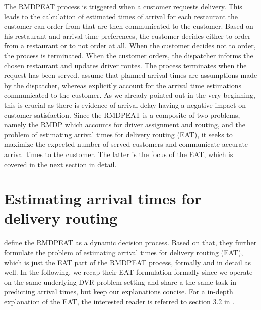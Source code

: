 The RMDPEAT process is triggered when a customer requests delivery. This leads to the calculation of estimated times of arrival for each restaurant the customer can order from that are then communicated to the customer. Based on his restaurant and arrival time preferences, the customer decides either to order from a restaurant or to not order at all. When the customer decides not to order, the process is terminated. When the customer orders, the dispatcher informs the chosen restaurant and updates driver routes. The process terminates when the request has been served. 
\cite{UlmerBarrett2017_TWAP} assume that planned arrival times are assumptions made by the dispatcher, whereas \cite{Hildebrandt2020_EAT} explicitly account for the arrival time estimations communicated to the customer. As we already pointed out in the very beginning, this is crucial as there is evidence of arrival delay having a negative impact on customer satisfaction.
Since the RMDPEAT is a composite of two problems, namely the RMDP which accounts for driver assignment and routing, and the problem of estimating arrival times for delivery routing (EAT), it seeks to maximize the expected number of served customers and communicate accurate arrival times to the customer. The latter is the focus of the EAT, which is covered in the next section in detail.

\section{Estimating arrival times for delivery routing}

\cite{Hildebrandt2020_EAT} define the RMDPEAT as a dynamic decision process. Based on that, they further formulate the problem of estimating arrival times for delivery routing (EAT), which is just the EAT part of the RMDPEAT process, formally and in detail as well. In the following, we recap their EAT formulation formally since we operate on the same underlying DVR problem setting and share a the same task in predicting arrival times, but keep our explanations concise. For a in-depth explanation of the EAT, the interested reader is referred to section 3.2 in \cite{Hildebrandt2020_EAT}. 

